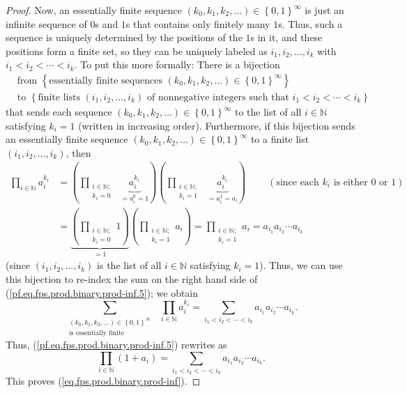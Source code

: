 \begin{proof}
Now, an essentially finite sequence $\left(  k_{0},k_{1},k_{2},\ldots\right)
\in\left\{  0,1\right\}  ^{\infty}$ is just an infinite sequence of $0$s and
$1$s that contains only finitely many $1$s. Thus, such a sequence is uniquely
determined by the positions of the $1$s in it, and these positions form a
finite set, so they can be uniquely labeled as $i_{1},i_{2},\ldots,i_{k}$ with
$i_{1}<i_{2}<\cdots<i_{k}$. To put this more formally: There is a bijection%
\begin{align*}
&  \text{from }\left\{  \text{essentially finite sequences }\left(
k_{0},k_{1},k_{2},\ldots\right)  \in\left\{  0,1\right\}  ^{\infty}\right\} \\
&  \text{to }\left\{  \text{finite lists }\left(  i_{1},i_{2},\ldots
,i_{k}\right)  \text{ of nonnegative integers such that }i_{1}<i_{2}%
<\cdots<i_{k}\right\}
\end{align*}
that sends each sequence $\left(  k_{0},k_{1},k_{2},\ldots\right)  \in\left\{
0,1\right\}  ^{\infty}$ to the list of all $i\in\mathbb{N}$ satisfying
$k_{i}=1$ (written in increasing order). Furthermore, if this bijection sends
an essentially finite sequence $\left(  k_{0},k_{1},k_{2},\ldots\right)
\in\left\{  0,1\right\}  ^{\infty}$ to a finite list $\left(  i_{1}%
,i_{2},\ldots,i_{k}\right)  $, then
\begin{align*}
\prod_{i\in\mathbb{N}}a_{i}^{k_{i}}  &  =\left(  \prod_{\substack{i\in
\mathbb{N};\\k_{i}=0}}\ \ \underbrace{a_{i}^{k_{i}}}_{=a_{i}^{0}=1}\right)
\left(  \prod_{\substack{i\in\mathbb{N};\\k_{i}=1}}\ \ \underbrace{a_{i}%
^{k_{i}}}_{=a_{i}^{1}=a_{i}}\right)  \ \ \ \ \ \ \ \ \ \ \left(  \text{since
each }k_{i}\text{ is either }0\text{ or }1\right) \\
&  =\underbrace{\left(  \prod_{\substack{i\in\mathbb{N};\\k_{i}=0}}1\right)
}_{=1}\left(  \prod_{\substack{i\in\mathbb{N};\\k_{i}=1}}a_{i}\right)
=\prod_{\substack{i\in\mathbb{N};\\k_{i}=1}}a_{i}=a_{i_{1}}a_{i_{2}}\cdots
a_{i_{k}}%
\end{align*}
(since $\left(  i_{1},i_{2},\ldots,i_{k}\right)  $ is the list of all
$i\in\mathbb{N}$ satisfying $k_{i}=1$). Thus, we can use this bijection to
re-index the sum on the right hand side of
(\ref{pf.eq.fps.prod.binary.prod-inf.5}); we obtain%
\[
\sum_{\substack{\left(  k_{0},k_{1},k_{2},\ldots\right)  \in\left\{
0,1\right\}  ^{\infty}\\\text{is essentially finite}}}\ \ \prod_{i\in
\mathbb{N}}a_{i}^{k_{i}}=\sum_{i_{1}<i_{2}<\cdots<i_{k}}a_{i_{1}}a_{i_{2}%
}\cdots a_{i_{k}}.
\]
Thus, (\ref{pf.eq.fps.prod.binary.prod-inf.5}) rewrites as%
\[
\prod_{i\in\mathbb{N}}\left(  1+a_{i}\right)  =\sum_{i_{1}<i_{2}<\cdots<i_{k}%
}a_{i_{1}}a_{i_{2}}\cdots a_{i_{k}}.
\]
This proves (\ref{eq.fps.prod.binary.prod-inf}).
\end{proof}

